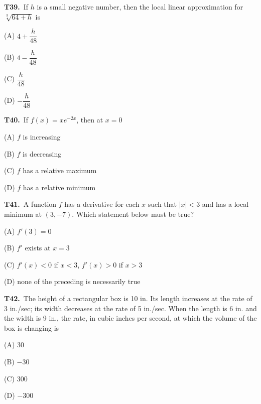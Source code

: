 \documentclass[11pt]{article}
\begin{document}
\bigskip\noindent\textbf{T39.}\ If $h$ is a small negative number, then the local linear approximation for $\sqrt[3]{64+h}$ is
\begin{list}{}{\setlength{\leftmargin}{3em}\setlength{\labelwidth}{2.5em}\setlength{\itemsep}{0pt}\setlength{\topsep}{2pt}}
\item[(A)] $4 + \dfrac{h}{48}$
\item[(B)] $4 - \dfrac{h}{48}$
\item[(C)] $\dfrac{h}{48}$
\item[(D)] $-\dfrac{h}{48}$
\end{list}

\bigskip\noindent\textbf{T40.}\ If $f(x) = xe^{-2x}$, then at $x=0$
\begin{list}{}{\setlength{\leftmargin}{3em}\setlength{\labelwidth}{2.5em}\setlength{\itemsep}{0pt}\setlength{\topsep}{2pt}}
\item[(A)] $f$ is increasing
\item[(B)] $f$ is decreasing
\item[(C)] $f$ has a relative maximum
\item[(D)] $f$ has a relative minimum
\end{list}

\bigskip\noindent\textbf{T41.}\ A function $f$ has a derivative for each $x$ such that $|x|<3$ and has a local minimum at $(3,-7)$. Which statement below must be true?
\begin{list}{}{\setlength{\leftmargin}{3em}\setlength{\labelwidth}{2.5em}\setlength{\itemsep}{0pt}\setlength{\topsep}{2pt}}
\item[(A)] $f'(3) = 0$
\item[(B)] $f'$ exists at $x=3$
\item[(C)] $f'(x)<0$ if $x<3$, $f'(x)>0$ if $x>3$
\item[(D)] none of the preceding is necessarily true
\end{list}

\bigskip\noindent\textbf{T42.}\ The height of a rectangular box is 10 in. Its length increases at the rate of 3 in./sec; its width decreases at the rate of 5 in./sec. When the length is 6 in. and the width is 9 in., the rate, in cubic inches per second, at which the volume of the box is changing is
\begin{list}{}{\setlength{\leftmargin}{3em}\setlength{\labelwidth}{2.5em}\setlength{\itemsep}{0pt}\setlength{\topsep}{2pt}}
\item[(A)] $30$
\item[(B)] $-30$
\item[(C)] $300$
\item[(D)] $-300$
\end{list}
\end{document}
